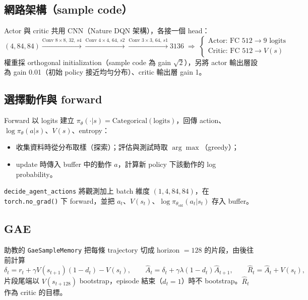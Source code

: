 \documentclass[11pt,a4paper]{article}
\begin{document}
\subsection{網路架構（sample code）}
Actor 與 critic 共用 CNN（Nature DQN 架構），各接一個 head：
\[
(4,84,84)\xrightarrow{\text{Conv }8\times8,\,32,\,s4}\xrightarrow{\text{Conv }4\times4,\,64,\,s2}\xrightarrow{\text{Conv }3\times3,\,64,\,s1}3136
\;\Rightarrow\;
\begin{cases}
\text{Actor: FC 512}\rightarrow 9 \text{ logits}\\
\text{Critic: FC 512}\rightarrow V(s)
\end{cases}
\]
權重採 orthogonal initialization（sample code 為 gain $\sqrt2$），另將 actor 輸出層設為 gain 0.01（初始 policy 接近均勻分布）、critic 輸出層 gain 1。

\subsection{選擇動作與 forward}
Forward 以 logits 建立 $\pi_\theta(\cdot|s)=\mathrm{Categorical}(\text{logits})$，回傳 action、$\log\pi_\theta(a|s)$、$V(s)$、entropy：
\begin{itemize}[leftmargin=1.2em]
  \item 收集資料時從分布取樣（探索）；評估與測試時取 $\arg\max$（greedy）；
  \item update 時傳入 buffer 中的動作 $a$，計算新 policy 下該動作的 log probability。
\end{itemize}
\texttt{decide\_agent\_actions} 將觀測加上 batch 維度 $(1,4,84,84)$，在 \texttt{torch.no\_grad()} 下 forward，並把 $a_t$、$V(s_t)$、$\log\pi_{\theta_\text{old}}(a_t|s_t)$ 存入 buffer。

\subsection{GAE}
助教的 \texttt{GaeSampleMemory} 把每條 trajectory 切成 horizon $=128$ 的片段，由後往前計算
\[
\delta_t = r_t + \gamma V(s_{t+1})(1-d_t) - V(s_t),\qquad
\hat A_t = \delta_t + \gamma\lambda(1-d_t)\hat A_{t+1},\qquad
\hat R_t = \hat A_t + V(s_t),
\]
片段尾端以 $V(s_{t+128})$ bootstrap，episode 結束（$d_t=1$）時不 bootstrap。$\hat R_t$ 作為 critic 的目標。
\end{document}
